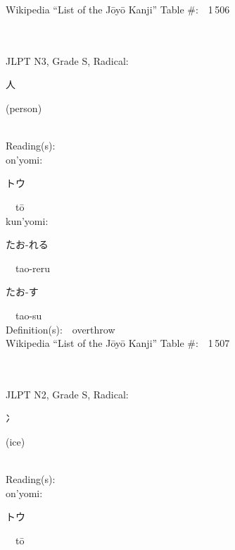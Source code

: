 \begin{multicols}{2}
Wikipedia ``List of the J\=oy\=o Kanji'' Table \#:\ \ 1\,506 \\
\ \ \\
{\fontsize{34pt}{40pt}  }\ \ \\  %
{JLPT N3, Grade S, Radical:\ \ {\begin{CJK}{UTF8}{min} 人 \end{CJK}} (person) } \\
Reading(s):\ \ \\
{\hspace*{1em}}on'yomi:\ \ \\
{\hspace*{2em}}{\begin{CJK}{UTF8}{min} トウ \end{CJK}}\ \ t\=o\ \ \\
{\hspace*{1em}}kun'yomi:\ \ \\
{\hspace*{2em}}{\begin{CJK}{UTF8}{min} たお-れる \end{CJK}}\ \ tao-reru\ \ \\
{\hspace*{2em}}{\begin{CJK}{UTF8}{min} たお-す \end{CJK}}\ \ tao-su\ \ \\
Definition(s):\ \ overthrow \\
Wikipedia ``List of the J\=oy\=o Kanji'' Table \#:\ \ 1\,507 \\
\ \ \\
{\fontsize{34pt}{40pt}  }\ \ \\  %
{JLPT N2, Grade S, Radical:\ \ {\begin{CJK}{UTF8}{min} 冫 \end{CJK}} (ice) } \\
Reading(s):\ \ \\
{\hspace*{1em}}on'yomi:\ \ \\
{\hspace*{2em}}{\begin{CJK}{UTF8}{min} トウ \end{CJK}}\ \ t\=o\ \ \\

\end{multicols}
